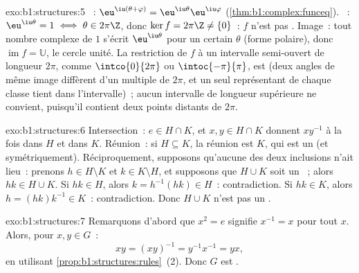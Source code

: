 \begin{solution}{exo:b1:structures:5}
~: $\eu^{\iu(\theta + \varphi)} =
\eu^{\iu\theta}\eu^{\iu\varphi}$ (\cref{thm:b1:complex:funceq}).
~: $\eu^{\iu\theta} = 1 \iff \theta \in 2\pi\Z$, donc $\ker f =
2\pi\Z \neq \{0\}$~: $f$ n'est pas . Image~: tout nombre
complexe de  $1$ s'écrit $\eu^{\iu\theta}$ pour un certain
$\theta$ (forme polaire), donc $\operatorname{im} f = \mathbb{U}$, le
cercle unité. La restriction de $f$ à un intervalle semi-ouvert de
longueur $2\pi$, comme $\intco{0}{2\pi}$ ou $\intoc{-\pi}{\pi}$, est
 (deux angles de même image diffèrent d'un multiple de $2\pi$,
et un seul représentant de chaque classe tient dans l'intervalle)~;
aucun intervalle de longueur supérieure ne convient, puisqu'il contient
deux points distants de $2\pi$.
\end{solution}

\begin{solution}{exo:b1:structures:6}
Intersection~: $e \in H \cap K$, et $x, y \in H \cap K$ donnent
$xy^{-1}$ à la fois dans $H$ et dans $K$. Réunion~: si $H \subseteq K$,
la réunion est $K$, qui est un  (et symétriquement).
Réciproquement, supposons qu'aucune des deux inclusions n'ait lieu~:
prenons $h \in H \setminus K$ et $k \in K \setminus H$, et supposons
que $H \cup K$ soit un ~; alors $hk \in H \cup K$.
Si $hk \in H$, alors $k = h^{-1}(hk) \in H$~: contradiction. Si $hk \in
K$, alors $h = (hk)k^{-1} \in K$~: contradiction. Donc $H \cup K$ n'est
pas un .
\end{solution}

\begin{solution}{exo:b1:structures:7}
Remarquons d'abord que $x^2 = e$ signifie $x^{-1} = x$ pour tout $x$.
Alors, pour $x, y \in G$~:
\[
xy = (xy)^{-1} = y^{-1} x^{-1} = yx ,
\]
en utilisant \cref{prop:b1:structures:rules}~(2). Donc $G$ est .
\end{solution}

